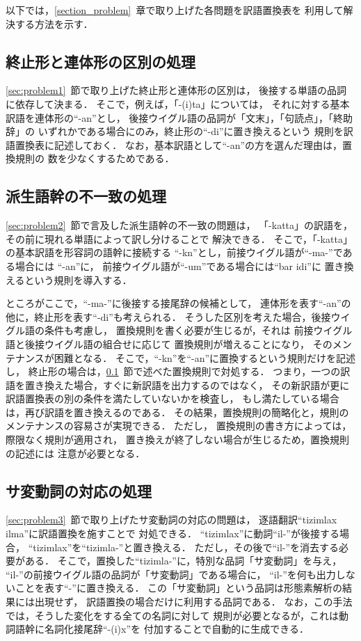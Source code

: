 以下では，\ref{section_problem}~章で取り上げた各問題を訳語置換表を
利用して解決する方法を示す．

\subsection{終止形と連体形の区別の処理}
\label{subsec:finite}
\ref{sec:problem1}~節で取り上げた終止形と連体形の区別は，
後接する単語の品詞に依存して決まる．
そこで，例えば，「-(i)ta」については，
それに対する基本訳語を連体形の``-\mg an''とし，
後接ウイグル語の品詞が「文末」，「句読点」，「終助辞」の
いずれかである場合にのみ，終止形の``-di''に置き換えるという
規則を訳語置換表に記述しておく．
なお，基本訳語として``-\mg an''の方を選んだ理由は，置換規則の
数を少なくするためである．

\subsection{派生語幹の不一致の処理}
\ref{sec:problem2}~節で言及した派生語幹の不一致の問題は，
「-katta」の訳語を，その前に現れる単語によって訳し分けることで
解決できる．
そこで，「-katta」の基本訳語を形容詞の語幹に接続する
``-k\me n''とし，前接ウイグル語が``-ma-''である場合には
``-\mg an''に，
前接ウイグル語が``-\mg um''である場合には``bar idi''に
置き換えるという規則を導入する．

ところがここで，``-ma-''に後接する接尾辞の候補として，
連体形を表す``-\mg an''の他に，終止形を表す``-di''も考えられる．
そうした区別を考えた場合，後接ウイグル語の条件も考慮し，
置換規則を書く必要が生じるが，それは
前接ウイグル語と後接ウイグル語の組合せに応じて
置換規則が増えることになり，
そのメンテナンスが困難となる．
そこで，``-k\me n''を``-\mg an''に置換するという規則だけを記述し，
終止形の場合は，\ref{subsec:finite}~節で述べた置換規則で対処する．
つまり，一つの訳語を置き換えた場合，すぐに新訳語を出力するのではなく，
その新訳語が更に訳語置換表の別の条件を満たしていないかを検査し，
もし満たしている場合は，再び訳語を置き換えるのである．
その結果，置換規則の簡略化と，規則のメンテナンスの容易さが実現できる．
ただし，
置換規則の書き方によっては，際限なく規則が適用され，
置き換えが終了しない場合が生じるため，置換規則の記述には
注意が必要となる．

\subsection{サ変動詞の対応の処理}
\ref{sec:problem3}~節で取り上げたサ変動詞の対応の問題は，
逐語翻訳``tizimlax \mk ilma\mk''に訳語置換を施すことで
対処できる．
``tizimlax''に動詞``\mk il-''が後接する場合，
``tizimlax''を``tizimla-''と置き換える．
ただし，その後で``\mk il-''を消去する必要がある．
そこで，置換した``tizimla-''に，特別な品詞「サ変動詞」を与え，
``\mk il-''の前接ウイグル語の品詞が「サ変動詞」である場合に，
``\mk il-''を何も出力しないことを表す``-''に置き換える．
この「サ変動詞」という品詞は形態素解析の結果には出現せず，
訳語置換の場合だけに利用する品詞である．
なお，この手法では，そうした変化をする全ての名詞に対して
規則が必要となるが，これは動詞語幹に名詞化接尾辞``-(i)x''を
付加することで自動的に生成できる．

